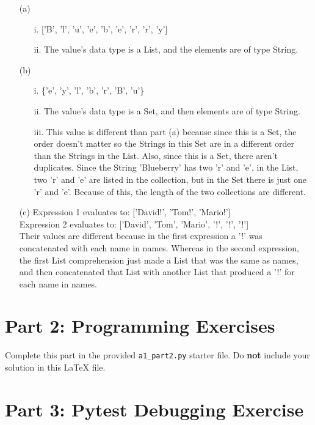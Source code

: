\documentclass[12pt]{article}
\begin{document}
\begin{enumerate}
\begin{enumerate}
\item[(a)]
\begin{enumerate}
    \item[i.] ['B', 'l', 'u', 'e', 'b', 'e', 'r', 'r', 'y']
    \item[ii.] The value's data type is a
    List, and the elements are of type String.
\end{enumerate}
\item[(b)]
\begin{enumerate}
    \item[i.] \{'e', 'y', 'l', 'b', 'r', 'B', 'u'\}
    \item[ii.] The value's data type is a Set, and then elements are of type String.
    \item[iii.] This value is different than part (a) because since this is a Set, the order doesn't matter so the Strings in this Set are in a different order than the Strings in the List. Also, since this is a Set, there aren't duplicates. Since the String 'Blueberry' has two 'r' and 'e', in the List, two 'r' and 'e' are listed in the collection, but in the Set there is just one 'r' and 'e'. Because of this, the length of the two collections are different.
\end{enumerate}
\item[(c)]
Expression 1 evaluates to: ['David!', 'Tom!', 'Mario!'] \\
Expression 2 evaluates to: ['David', 'Tom', 'Mario', '!', '!', '!'] \\
Their values are different because in the first expression a '!' was concatenated with each name in names. Whereas in the second expression, the first List comprehension just made a List that was the same as names, and then concatenated that List with another List that produced a '!' for each name in names.
\end{enumerate}
\end{enumerate}

\section*{Part 2: Programming Exercises}

Complete this part in the provided \texttt{a1\_part2.py} starter file.
Do \textbf{not} include your solution in this LaTeX file.

\section*{Part 3: Pytest Debugging Exercise}
\end{document}
